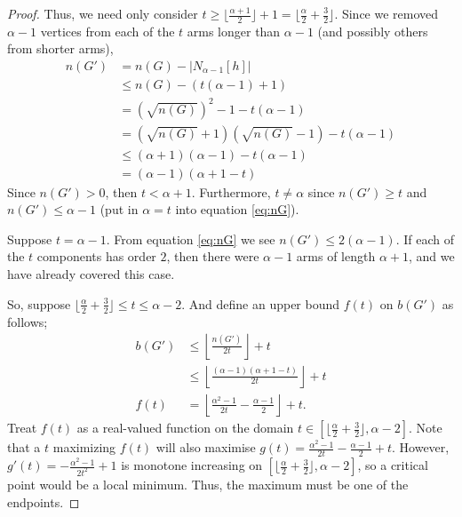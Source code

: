 \documentclass[12pt]{article}
\begin{document}
\begin{proof}
    Thus, we need only consider $t \geq \lfloor \frac{\alpha + 1}{2} \rfloor + 1 = \lfloor \frac{\alpha}{2} + \frac{3}{2} \rfloor$. 
    Since we removed $\alpha - 1$ vertices from each of the $t$ arms longer than $\alpha - 1$ (and possibly others from shorter arms),
    \begin{align}
        n(G') &= n(G) - |N_{\alpha - 1}[h]| \nonumber \\
        &\leq n(G) - \left(t(\alpha - 1) + 1\right) \nonumber \\
        &= \left(\sqrt{n(G)}\right)^2 - 1 - t(\alpha - 1) \nonumber \\
        &= (\sqrt{n(G)} + 1)(\sqrt{n(G)} - 1) - t(\alpha - 1) \nonumber \\
        &\leq (\alpha + 1)(\alpha - 1) - t(\alpha - 1) \nonumber \\
        &= (\alpha - 1)(\alpha + 1 - t) \label{eq:nG}
    \end{align}
    Since $n(G') > 0$, then $t < \alpha + 1$.
    Furthermore, $t \neq \alpha$ since $n(G') \geq t$ and $n(G') \leq \alpha - 1$ (put in $\alpha = t$ into equation \ref{eq:nG}).

    Suppose $t = \alpha-1$.
    From equation \ref{eq:nG} we see $n(G') \leq 2(\alpha-1)$.
    If each of the $t$ components has order $2$, then there were $\alpha - 1$ arms of length $\alpha + 1$, and we have already covered this case.

    So, suppose $\lfloor \frac{\alpha}{2} + \frac{3}{2} \rfloor \leq t \leq \alpha - 2$.
    And define an upper bound $f(t)$ on $b(G')$ as follows;
    \begin{align}
        b(G') &\leq \left\lfloor \frac{n(G')}{2t} \right\rfloor + t \nonumber \\
        &\leq \left\lfloor \frac{(\alpha - 1)(\alpha + 1 - t)}{2t} \right\rfloor + t \nonumber\\
        f(t) &= \left\lfloor \frac{\alpha^2 - 1}{2t} - \frac{\alpha - 1}{2} \right\rfloor + t. \label{eq:bupper}
    \end{align}
    Treat $f(t)$ as a real-valued function on the domain $t \in [\lfloor \frac{\alpha}{2} + \frac{3}{2} \rfloor, \alpha - 2]$.
    Note that a $t$ maximizing $f(t)$ will also maximise $g(t) = \frac{\alpha^2 - 1}{2t} - \frac{\alpha - 1}{2} + t$.
    However, $g'(t) = -\frac{\alpha^2 - 1}{2t^2} + 1$ is monotone increasing on $[\lfloor \frac{\alpha}{2} + \frac{3}{2} \rfloor, \alpha - 2]$, so a critical point would be a local minimum.
    Thus, the maximum must be one of the endpoints.


\end{proof}
\end{document}
